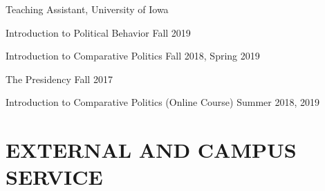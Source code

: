 \documentclass[10.5pt,]{article}
\providecommand{\tightlist}{%
	\setlength{\itemsep}{0pt}\setlength{\parskip}{0pt}}
\renewenvironment{itemize}{
	\begin{list}{}{
			\setlength{\leftmargin}{1.5em}
		}
	}{
	\end{list}
}
\begin{document}
\begin{itemize}
  \begin{itemize}
  \tightlist
  \item
    Teaching Assistant, University of Iowa

    \begin{itemize}
    \tightlist
    \item
      Introduction to Political Behavior \hfill Fall 2019
    \item
      Introduction to Comparative Politics \hfill Fall 2018, Spring 2019
    \item
      The Presidency \hfill Fall 2017
    \item
      Introduction to Comparative Politics (Online Course) \hfill Summer
      2018, 2019
    \end{itemize}
  \end{itemize}
\end{itemize}

\section{EXTERNAL AND CAMPUS SERVICE}\label{external-and-campus-service}
\end{document}
